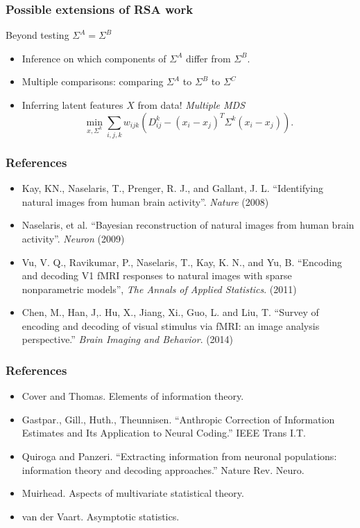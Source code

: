 \documentclass{beamer}
\begin{document}
\begin{frame}
\frametitle{Possible extensions of RSA work}
Beyond testing $\Sigma^A = \Sigma^B$
\begin{itemize}
\item Inference on which components of $\Sigma^A$ differ from $\Sigma^B$.
\item Multiple comparisons: comparing $\Sigma^A$ to $\Sigma^B$ to $\Sigma^C$
\item Inferring latent features $X$ from data!  \emph{Multiple MDS}
\[
\min_{x, \Sigma^k} \sum_{i,j,k} w_{ijk} (D^k_{ij} - (x_i - x_j)^T \Sigma^k (x_i - x_j)).
\]
\end{itemize}
\end{frame}

{

}

\begin{frame}
\frametitle{References}
\begin{itemize}
\item Kay, KN., Naselaris, T., Prenger, R. J., and Gallant, J. L.
  ``Identifying natural images from human brain
  activity''. \emph{Nature} (2008)
\item Naselaris, et al. ``Bayesian reconstruction of natural images
  from human brain activity''.  \emph{Neuron} (2009)
\item Vu, V. Q., Ravikumar, P., Naselaris, T., Kay, K. N., and Yu, B.
  ``Encoding and decoding V1 fMRI responses to natural images with
  sparse nonparametric models'', \emph{The Annals of Applied
    Statistics}. (2011)
\item Chen, M., Han, J,. Hu, X., Jiang, Xi., Guo, L. and Liu, T.
  ``Survey of encoding and decoding of visual stimulus via fMRI: an
  image analysis perspective.'' \emph{Brain Imaging and
    Behavior}. (2014)
\end{itemize}
\end{frame}

\begin{frame}
\frametitle{References}
\begin{itemize}
\item Cover and Thomas.  Elements of information theory.
\item Gastpar., Gill., Huth., Theunnisen.  ``Anthropic Correction of Information Estimates and Its Application to Neural Coding.'' IEEE Trans I.T.
\item Quiroga and Panzeri. ``Extracting information from neuronal populations: information theory and decoding approaches.''  Nature Rev. Neuro.
\item Muirhead.  Aspects of multivariate statistical theory.
\item van der Vaart.  Asymptotic statistics.
\end{itemize}
\end{frame}
\end{document}
